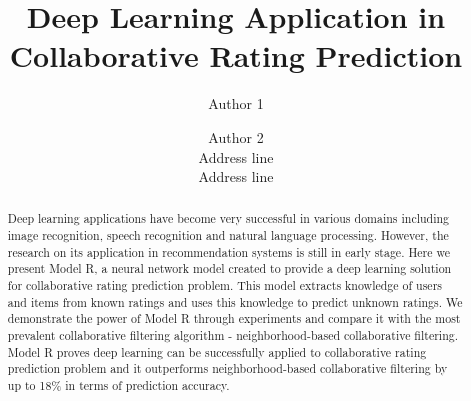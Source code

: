 \documentclass[letterpaper]{article}
\title{Deep Learning Application in Collaborative Rating Prediction}
\author{Author 1 \and Author 2\\
	Address line\\
	Address line\\
}
\begin{document}
\maketitle

\begin{abstract}
	Deep learning applications have become very successful in various domains 
	including image recognition, speech recognition and natural language 
	processing.
	However, the research on its application in recommendation systems is 
	still in early stage.
	Here we present Model R, a neural network model created to provide a deep 
	learning solution for collaborative rating prediction problem.
	This model extracts knowledge of users and items from known ratings and 
	uses this knowledge to predict unknown ratings.
	We demonstrate the power of Model R through experiments and compare it with 
	the most prevalent collaborative filtering algorithm - neighborhood-based 
	collaborative filtering.
	Model R proves deep learning can be successfully applied to collaborative 
	rating prediction problem and it outperforms neighborhood-based 
	collaborative filtering by up to 18\% in terms of prediction accuracy.
\end{abstract}
\end{document}
